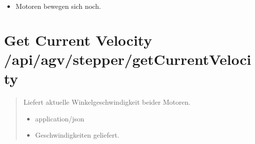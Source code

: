 \documentclass[letterpaper,10pt,english]{sphinxmanual}
\begin{document}
\sphinxAtStartPar
{}
\begin{itemize}
\item {} 
\sphinxAtStartPar
{} \textendash{} Motoren bewegen sich noch.

\end{itemize}


\section{Get Current Velocity \textendash{} /api/agv/stepper/getCurrentVelocity}
\label{\detokenize{agv_rest_api_stepper:get-current-velocity-api-agv-stepper-getcurrentvelocity}}\label{\detokenize{agv_rest_api_stepper:get-api-agv-stepper-getcurrentvelocity}}

\begin{fulllineitems}
\label{\detokenize{agv_rest_api_stepper:get--api-agv-stepper-getCurrentVelocity}}
\pysigstartsignatures
\pysigline
{}
\pysigstopsignatures\begin{quote}\begin{description}
\sphinxAtStartPar
Liefert aktuelle Winkelgeschwindigkeit beider Motoren.

\begin{itemize}
\item {} 
\sphinxAtStartPar
{} \textendash{} application/json

\end{itemize}

\begin{itemize}
\item {} 
\sphinxAtStartPar
{} \textendash{} Geschwindigkeiten geliefert.

\end{itemize}

\end{description}\end{quote}

\end{fulllineitems}


\sphinxAtStartPar
{}
\end{document}
